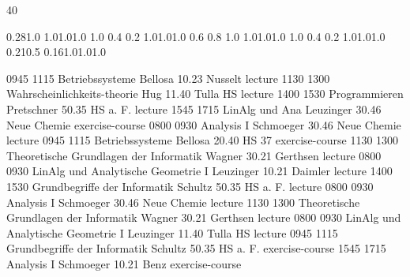 \documentclass[a4paper,10pt]{report}
\begin{document}
\thispagestyle{empty}
\begin{landscape}
\noindent{}

\setslotsize{2.8cm}{0.3cm}
 {40}
\settextframe{0.8mm}

\seteventcornerradius{0pt}


 {0.28}{1.0} {1.0}{1.0}{1.0}
    {1.0} {0.4} {0.2} {1.0}{1.0}{1.0}
   {0.6} {0.8} {1.0} {1.0}{1.0}{1.0}
 {1.0} {0.4} {0.2} {1.0}{1.0}{1.0}
       {0.21}{0.5} {0.16}{1.0}{1.0}{1.0}

\begin{timetable}
   {0945} {1115} {Betriebssysteme}                        {Bellosa}          {10.23 Nusselt}     {lecture}
   {1130} {1300} {Wahrscheinlichkeits-theorie}            {Hug}              {11.40 Tulla HS}    {lecture}
   {1400} {1530} {Programmieren}                          {Pretschner}       {50.35 HS a. F.}    {lecture}
   {1545} {1715} {LinAlg und Ana}                         {Leuzinger}        {30.46 Neue Chemie} {exercise-course}
   {0800} {0930} {Analysis I}                             {Schmoeger}        {30.46 Neue Chemie} {lecture}
   {0945} {1115} {Betriebssysteme}                        {Bellosa}          {20.40 HS 37}       {exercise-course}
   {1130} {1300} {Theoretische Grundlagen der Informatik} {Wagner}           {30.21 Gerthsen}    {lecture}
   {0800} {0930} {LinAlg und Analytische Geometrie I}     {Leuzinger}        {10.21 Daimler}     {lecture}
   {1400} {1530} {Grundbegriffe der Informatik}           {Schultz}          {50.35 HS a. F.}    {lecture}
   {0800} {0930} {Analysis I}                             {Schmoeger}        {30.46 Neue Chemie} {lecture}
   {1130} {1300} {Theoretische Grundlagen der Informatik} {Wagner}           {30.21 Gerthsen}    {lecture}
   {0800} {0930} {LinAlg und Analytische Geometrie I}     {Leuzinger}        {11.40 Tulla HS}    {lecture}
   {0945} {1115} {Grundbegriffe der Informatik}           {Schultz}          {50.35 HS a. F.}    {exercise-course}
   {1545} {1715} {Analysis I}                             {Schmoeger}        {10.21 Benz}        {exercise-course}
\end{timetable}
\end{landscape}
\end{document}
